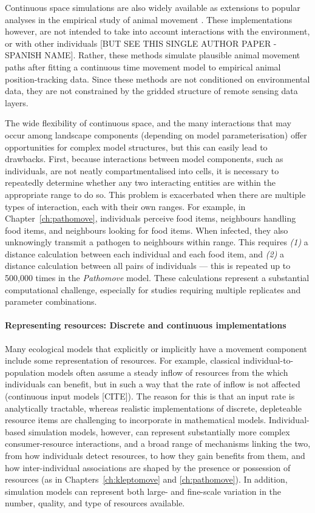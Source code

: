 Continuous space simulations are also widely available as extensions to popular analyses in the empirical study of animal movement \citep{noonan2019,calabrese2016,calabrese2018,fleming2014,fleming2015,gurarie2017,gurarie2016}.
These implementations however, are not intended to take into account interactions with the environment, or with other individuals [BUT SEE THIS SINGLE AUTHOR PAPER - SPANISH NAME].
Rather, these methods simulate plausible animal movement paths after fitting a continuous time movement model to empirical animal position-tracking data.
Since these methods are not conditioned on environmental data, they are not constrained by the gridded structure of remote sensing data layers.

The wide flexibility of continuous space, and the many interactions that may occur among landscape components (depending on model parameterisation) offer opportunities for complex model structures, but this can easily lead to drawbacks.
First, because interactions between model components, such as individuals, are not neatly compartmentalised into cells, it is necessary to repeatedly determine whether any two interacting entities are within the appropriate range to do so.
This problem is exacerbated when there are multiple types of interaction, each with their own ranges.
For example, in Chapter~\ref{ch:pathomove}, individuals perceive food items, neighbours handling food items, and neighbours looking for food items.
When infected, they also unknowingly transmit a pathogen to neighbours within range.
This requires \emph{(1)} a distance calculation between each individual and each food item, and \emph{(2)} a distance calculation between all pairs of individuals --- this is repeated up to 500,000 times in the \emph{Pathomove} model.
These calculations represent a substantial computational challenge, especially for studies requiring multiple replicates and parameter combinations.

\paragraph*{Representing resources: Discrete and continuous implementations}

Many ecological models that explicitly or implicitly have a movement component include some representation of resources.
For example, classical individual-to-population models often assume a steady inflow of resources from the which individuals can benefit, but in such a way that the rate of inflow is not affected (continuous input models [CITE]).
The reason for this is that an input rate is analytically tractable, whereas realistic implementations of discrete, depleteable resource items are challenging to incorporate in mathematical models.
Individual-based simulation models, however, can represent substantially more complex consumer-resource interactions, and a broad range of mechanisms linking the two, from how individuals detect resources, to how they gain benefits from them, and how inter-individual associations are shaped by the presence or possession of resources (as in Chapters~\ref{ch:kleptomove} and \ref{ch:pathomove}).
In addition, simulation models can represent both large- and fine-scale variation in the number, quality, and type of resources available.

